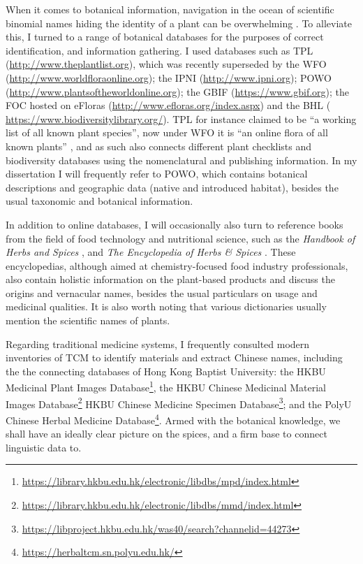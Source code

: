 When it comes to botanical information, navigation in the ocean of scientific binomial names hiding the identity of a plant can be overwhelming \autocite{spencer_plant_2020}. To alleviate this, I turned to a range of botanical databases for the purposes of correct identification, and information gathering. I used databases such as \gls{TPL} (\url{http://www.theplantlist.org}), which was recently superseded by the \gls{WFO} (\url{http://www.worldfloraonline.org}); the \gls{IPNI} (\url{http://www.ipni.org}); \gls{POWO} (\url{http://www.plantsoftheworldonline.org}); the \gls{GBIF} (\url{https://www.gbif.org}); the \gls{FOC} hosted on eFloras (\url{http://www.efloras.org/index.aspx}) and the \gls{BHL} (\url{ https://www.biodiversitylibrary.org/}). \gls{TPL} for instance claimed to be ``a working list of all known plant species'', now under \gls{WFO} it is ``an online flora of all known plants'' , and as such also connects different plant checklists and biodiversity databases using the nomenclatural and publishing information. In my dissertation I will frequently refer to \gls{POWO}, which contains botanical descriptions and geographic data (native and introduced habitat), besides the usual taxonomic and botanical information. 

In addition to online databases, I will occasionally also turn to reference books from the field of food technology and nutritional science, such as the \textit{Handbook of Herbs and Spices} \autocite{peter_handbook_2012,peter_handbook_2006}, and \textit{The Encyclopedia of Herbs \& Spices} \autocite{ravindran_encyclopedia_2017}. These encyclopedias, although aimed at chemistry-focused food industry professionals, also contain holistic information on the plant-based products and discuss the origins and vernacular names, besides the usual particulars on usage and medicinal qualities. It is also worth noting that various dictionaries usually mention the scientific names of plants.

Regarding traditional medicine systems, I frequently consulted modern inventories of \gls{TCM} to identify materials and extract Chinese names, including the the connecting databases of Hong Kong Baptist University: the HKBU Medicinal Plant Images Database\footnote{\url{https://library.hkbu.edu.hk/electronic/libdbs/mpd/index.html}}, the HKBU Chinese Medicinal Material Images Database\footnote{\url{https://library.hkbu.edu.hk/electronic/libdbs/mmd/index.html}} HKBU Chinese Medicine Specimen Database\footnote{\url{https://libproject.hkbu.edu.hk/was40/search?channelid=44273}}; and the PolyU Chinese Herbal Medicine Database\footnote{\url{https://herbaltcm.sn.polyu.edu.hk/}}. Armed with the botanical knowledge, we shall have an ideally clear picture on the spices, and a firm base to connect linguistic data to.

